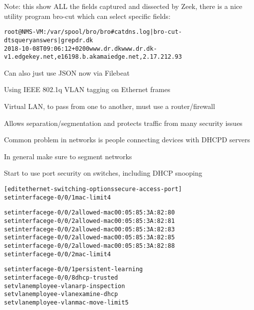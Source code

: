 \documentclass[Screen16to9,17pt]{foils}
\begin{document}
Note: this show ALL the fields captured and dissected by Zeek, there is a nice utility program bro-cut which can select specific fields:

\begin{alltt}\small
root@NMS-VM:/var/spool/bro/bro# cat dns.log | bro-cut -d ts query answers | grep dr.dk
2018-10-08T09:06:12+0200	www.dr.dk	www.dr.dk-v1.edgekey.net,e16198.b.akamaiedge.net,2.17.212.93
\end{alltt}

Can also just use JSON now via Filebeat





\begin{list1}
\item Using IEEE 802.1q  VLAN tagging on Ethernet frames
\item Virtual LAN, to pass from one to another, must use a router/firewall
\item Allows separation/segmentation and protects traffic from many security issues
\end{list1}



\begin{list1}
\item Common problem in networks is people connecting devices with DHCPD servers
\item In general make sure to segment networks
\item Start to use port security on switches, including DHCP snooping\\
\end{list1}


\begin{alltt}\small
[edit ethernet-switching-options secure-access-port]
set interface ge-0/0/1 mac-limit 4

set interface ge-0/0/2 allowed-mac 00:05:85:3A:82:80
set interface ge-0/0/2 allowed-mac 00:05:85:3A:82:81
set interface ge-0/0/2 allowed-mac 00:05:85:3A:82:83
set interface ge-0/0/2 allowed-mac 00:05:85:3A:82:85
set interface ge-0/0/2 allowed-mac 00:05:85:3A:82:88
set interface ge-0/0/2 mac-limit 4

set interface ge-0/0/1 persistent-learning
set interface ge-0/0/8 dhcp-trusted
set vlan employee-vlan arp-inspection
set vlan employee-vlan examine-dhcp
set vlan employee-vlan mac-move-limit 5
\end{alltt}
\end{document}
